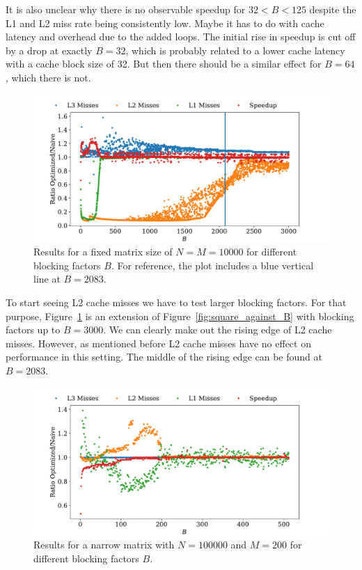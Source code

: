 \documentclass[a4paper, 11pt]{article}
\begin{document}
It is also unclear why there is no observable speedup for $32 < B < 125$
despite the L1 and L2 miss rate being consistently low. Maybe it has to do with
cache latency and overhead due to the added loops. The initial rise in speedup
is cut off by a drop at exactly $B = 32$, which is probably related to a lower
cache latency with a cache block size of 32. But then there should be a similar
effect for $B = 64$, which there is not.

\FloatBarrier
\begin{figure}
  \centering
  \includegraphics[width=\textwidth]{../plot/square_against_B_L2.pdf}
  \caption{Results for a fixed matrix size of $N = M = 10000$ for different
  blocking factors $B$. For reference, the plot includes a blue vertical line
  at $B=2083$.}
  \label{fig:square_against_B_L2}
\end{figure}
To start seeing L2 cache misses we have to test larger blocking factors. For
that purpose, Figure~\ref{fig:square_against_B_L2} is an extension of
Figure~\ref{fig:square_against_B} with blocking factors up to $B=3000$. We can
clearly make out the rising edge of L2 cache misses. However, as mentioned
before L2 cache misses have no effect on performance in this setting. The
middle of the rising edge can be found at $B=2083$.

\FloatBarrier
\begin{figure}
  \centering
  \includegraphics[width=\textwidth]{../plot/narrow_against_B.pdf}
  \caption{Results for a narrow matrix with $N=100000$ and $M=200$ for different blocking factors $B$.}
  \label{fig:narrow_against_B}
\end{figure}
\end{document}
